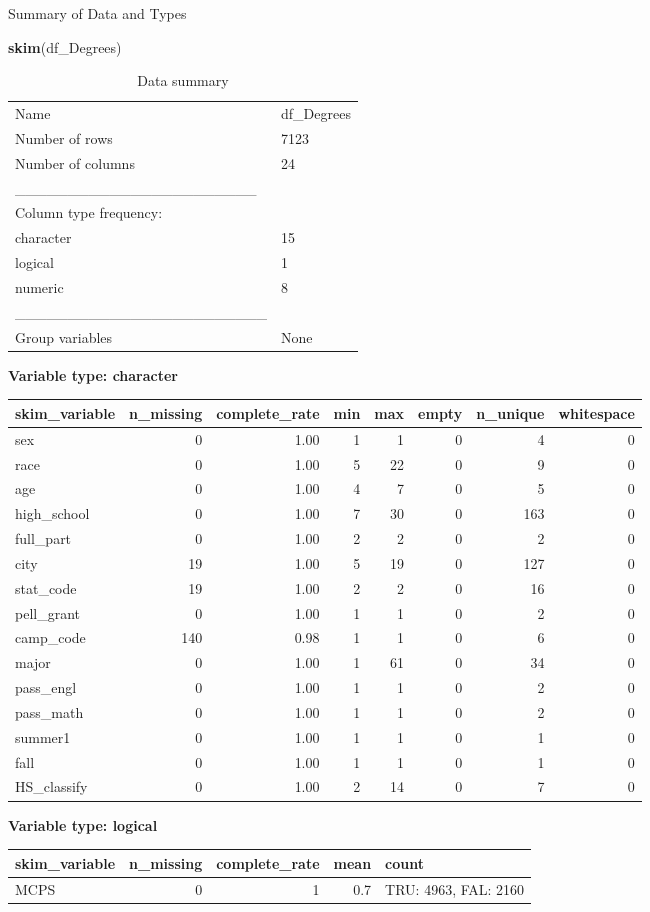 \documentclass[]{article}
\newenvironment{Shaded}{\begin{snugshade}}{\end{snugshade}}
\newcommand{\KeywordTok}[1]{\textcolor[rgb]{0.13,0.29,0.53}{\textbf{#1}}}
\newcommand{\NormalTok}[1]{#1}
\begin{document}
Summary of Data and Types

\begin{Shaded}
\begin{Highlighting}[]
\KeywordTok{skim}\NormalTok{(df_Degrees)}
\end{Highlighting}
\end{Shaded}

\begin{longtable}[]{@{}ll@{}}
\caption{Data summary}\tabularnewline
\toprule
\endhead
Name & df\_Degrees\tabularnewline
Number of rows & 7123\tabularnewline
Number of columns & 24\tabularnewline
\_\_\_\_\_\_\_\_\_\_\_\_\_\_\_\_\_\_\_\_\_\_\_ &\tabularnewline
Column type frequency: &\tabularnewline
character & 15\tabularnewline
logical & 1\tabularnewline
numeric & 8\tabularnewline
\_\_\_\_\_\_\_\_\_\_\_\_\_\_\_\_\_\_\_\_\_\_\_\_ &\tabularnewline
Group variables & None\tabularnewline
\bottomrule
\end{longtable}

\textbf{Variable type: character}

\begin{longtable}[]{@{}lrrrrrrr@{}}
\toprule
skim\_variable & n\_missing & complete\_rate & min & max & empty &
n\_unique & whitespace\tabularnewline
\midrule
\endhead
sex & 0 & 1.00 & 1 & 1 & 0 & 4 & 0\tabularnewline
race & 0 & 1.00 & 5 & 22 & 0 & 9 & 0\tabularnewline
age & 0 & 1.00 & 4 & 7 & 0 & 5 & 0\tabularnewline
high\_school & 0 & 1.00 & 7 & 30 & 0 & 163 & 0\tabularnewline
full\_part & 0 & 1.00 & 2 & 2 & 0 & 2 & 0\tabularnewline
city & 19 & 1.00 & 5 & 19 & 0 & 127 & 0\tabularnewline
stat\_code & 19 & 1.00 & 2 & 2 & 0 & 16 & 0\tabularnewline
pell\_grant & 0 & 1.00 & 1 & 1 & 0 & 2 & 0\tabularnewline
camp\_code & 140 & 0.98 & 1 & 1 & 0 & 6 & 0\tabularnewline
major & 0 & 1.00 & 1 & 61 & 0 & 34 & 0\tabularnewline
pass\_engl & 0 & 1.00 & 1 & 1 & 0 & 2 & 0\tabularnewline
pass\_math & 0 & 1.00 & 1 & 1 & 0 & 2 & 0\tabularnewline
summer1 & 0 & 1.00 & 1 & 1 & 0 & 1 & 0\tabularnewline
fall & 0 & 1.00 & 1 & 1 & 0 & 1 & 0\tabularnewline
HS\_classify & 0 & 1.00 & 2 & 14 & 0 & 7 & 0\tabularnewline
\bottomrule
\end{longtable}

\textbf{Variable type: logical}

\begin{longtable}[]{@{}lrrrl@{}}
\toprule
skim\_variable & n\_missing & complete\_rate & mean &
count\tabularnewline
\midrule
\endhead
MCPS & 0 & 1 & 0.7 & TRU: 4963, FAL: 2160\tabularnewline
\bottomrule
\end{longtable}
\end{document}
